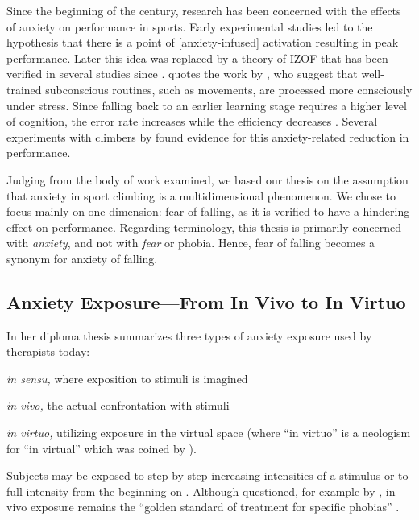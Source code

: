 Since the beginning of the  century, research has been concerned with the effects of anxiety on performance in sports. Early experimental studies led to the hypothesis that there is a point of [anxiety-infused] activation resulting in peak performance. Later this idea was replaced by a theory of \gls{IZOF} that has been verified in several studies since \autocite{Ruiz2015}. \textcite{Bertle2014} quotes the work by \textcite{Masters2008,Liao2002}, who suggest that well-trained subconscious routines, such as movements, are processed more consciously under stress. Since falling back to an earlier learning stage requires a higher level of cognition, the error rate increases while the efficiency decreases \autocite[\textit{Theory of Reinvest, }][]{Masters2008}. Several experiments with climbers by \textcite{Pijpers2005,Pijpers2003} found evidence for this anxiety-related reduction in performance.

Judging from the body of work examined, we based our thesis on the assumption that anxiety in sport climbing is a multidimensional phenomenon. We chose to focus mainly on one dimension: fear of falling, as it is verified to have a hindering effect on performance. Regarding terminology, this thesis is primarily concerned with \textit{anxiety}, and not with \textit{fear} or phobia. Hence, fear of falling becomes a synonym for anxiety of falling. 

\subsection{Anxiety Exposure---From In Vivo to In Virtuo}

In her diploma thesis \citeauthor{Scharfenberger2012} summarizes three types of anxiety exposure used by therapists today:  
\begin{itemize*}[itemjoin={{, }},itemjoin*={{, and }},noitemsep,nolistsep]
	\item[\textit{in sensu,}] where exposition to stimuli is imagined 
	\item[\textit{in vivo,}] the actual confrontation with stimuli
	\item[\textit{in virtuo,}] utilizing exposure in the virtual space (where “in virtuo” is a neologism for “in virtual” which was coined by \textcite{Tisseau2008}).
\end{itemize*}
Subjects may be exposed to step-by-step increasing intensities of a stimulus or to full intensity from the beginning on \autocite[i.\,e. ”flooding”, ][]{Scharfenberger2012}. Although questioned, for example by \textcite{DeSilva1981}, in vivo exposure remains the “golden standard of treatment for specific phobias” \autocite{Emmelkamp2002}.

